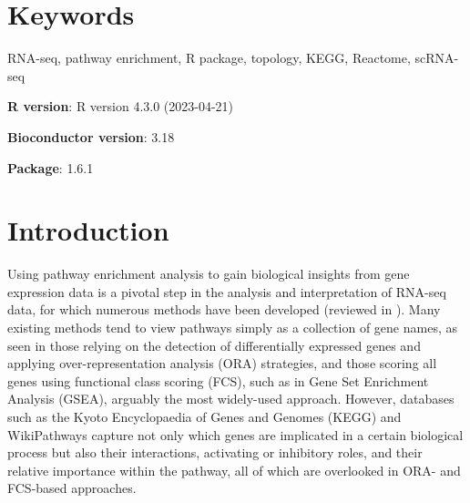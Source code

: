 \documentclass[9pt,a4paper,]{extarticle}
\begin{document}
\section*{Keywords}
RNA-seq, pathway enrichment, R package, topology, KEGG, Reactome, scRNA-seq


\clearpage
\pagestyle{main}

\textbf{R version}: R version 4.3.0 (2023-04-21)

\textbf{Bioconductor version}: 3.18

\textbf{Package}: 1.6.1

\hypertarget{introduction}{%
\section{Introduction}\label{introduction}}

Using pathway enrichment analysis to gain biological insights from gene expression data is a pivotal step in the analysis and interpretation of RNA-seq data, for which numerous methods have been developed (reviewed in \citep{Maleki2020-ur, Mubeen2022-eq}).
Many existing methods tend to view pathways simply as a collection of gene names, as seen in those relying on the detection of differentially expressed genes and applying over-representation analysis (ORA) strategies, and those scoring all genes using functional class scoring (FCS), such as in Gene Set Enrichment Analysis (GSEA)\citep{Subramanian2005-lx}, arguably the most widely-used approach.
However, databases such as the Kyoto Encyclopaedia of Genes and Genomes (KEGG)\citep{OgataKEGGKyotoEncyclopediaa} and WikiPathways\citep{Martens2021} capture not only which genes are implicated in a certain biological process but also their interactions, activating or inhibitory roles, and their relative importance within the pathway, all of which are overlooked in ORA- and FCS-based approaches.
\end{document}
